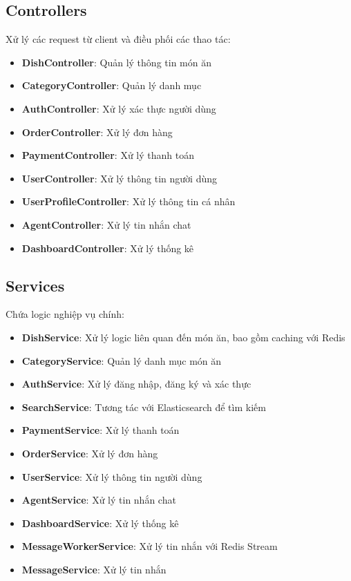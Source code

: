 \subsection{Controllers}
Xử lý các request từ client và điều phối các thao tác:
\begin{itemize}
    \item \textbf{DishController}: Quản lý thông tin món ăn
    \item \textbf{CategoryController}: Quản lý danh mục
    \item \textbf{AuthController}: Xử lý xác thực người dùng
    \item \textbf{OrderController}: Xử lý đơn hàng
    \item \textbf{PaymentController}: Xử lý thanh toán
    \item \textbf{UserController}: Xử lý thông tin người dùng
    \item \textbf{UserProfileController}: Xử lý thông tin cá nhân
    \item \textbf{AgentController}: Xử lý tin nhắn chat
    \item \textbf{DashboardController}: Xử lý thống kê
\end{itemize}

\subsection{Services}
Chứa logic nghiệp vụ chính:
\begin{itemize}
    \item \textbf{DishService}: Xử lý logic liên quan đến món ăn, bao gồm caching với Redis
    \item \textbf{CategoryService}: Quản lý danh mục món ăn
    \item \textbf{AuthService}: Xử lý đăng nhập, đăng ký và xác thực
    \item \textbf{SearchService}: Tương tác với Elasticsearch để tìm kiếm
    \item \textbf{PaymentService}: Xử lý thanh toán
    \item \textbf{OrderService}: Xử lý đơn hàng
    \item \textbf{UserService}: Xử lý thông tin người dùng
    \item \textbf{AgentService}: Xử lý tin nhắn chat
    \item \textbf{DashboardService}: Xử lý thống kê
    \item \textbf{MessageWorkerService}: Xử lý tin nhắn với Redis Stream
    \item \textbf{MessageService}: Xử lý tin nhắn
\end{itemize}

